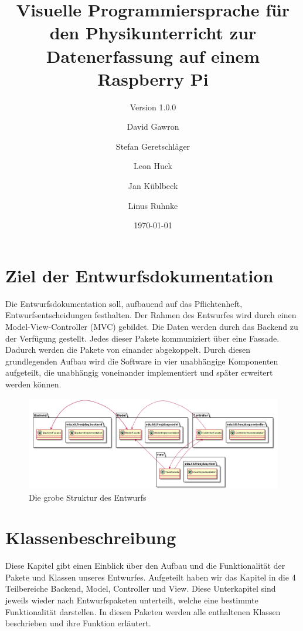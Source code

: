 \documentclass[parskip=full]{scrartcl}
\title{Visuelle Programmiersprache für den Physikunterricht zur Datenerfassung auf einem Raspberry Pi}
\subtitle{Version 1.0.0}
\author{David Gawron \and Stefan Geretschläger \and Leon Huck \and Jan Küblbeck \and Linus Ruhnke}
\date{\today}
\begin{document}
\maketitle

\clearpage
\tableofcontents 					%

\clearpage
\section{Ziel der Entwurfsdokumentation} \label{einleitung}
Die Entwurfsdokumentation soll, aufbauend auf das Pflichtenheft, Entwurfsentscheidungen festhalten. Der Rahmen des Entwurfes wird durch einen \gls{Model-View-Controller} (MVC) gebildet. Die Daten werden durch das Backend zu der Verfügung gestellt. Jedes dieser Pakete kommuniziert über eine Fassade. Dadurch werden die Pakete von einander abgekoppelt.
Durch diesen grundlegenden Aufbau wird die Software in vier unabhängige Komponenten aufgeteilt, die unabhängig voneinander implementiert und später erweitert werden können.

\begin{figure}[htbp]
	\begin{center}
		\includegraphics[width = 14cm]{Grafiken/Grober_Aufbau.png}
		\caption{Die grobe Struktur des Entwurfs}
		\label{Entwurf_Grob}
	\end{center}
\end{figure}


\clearpage
\section{Klassenbeschreibung}

Diese Kapitel gibt einen Einblick über den Aufbau und die Funktionalität der Pakete und Klassen unseres Entwurfes. Aufgeteilt haben wir das Kapitel in die 4 Teilbereiche Backend, Model, Controller und View. Diese Unterkapitel sind jeweils wieder nach Entwurfspaketen unterteilt, welche eine bestimmte Funktionalität darstellen. In diesen Paketen werden alle enthaltenen Klassen beschrieben und ihre Funktion erläutert.
\end{document}
